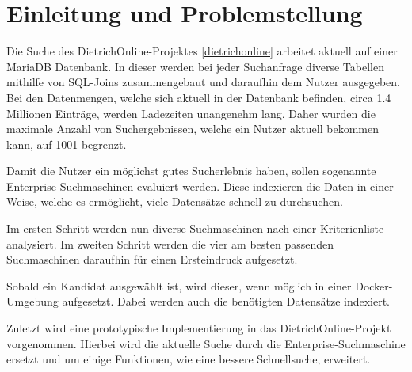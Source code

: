 \chapter{Einleitung und Problemstellung}


Die Suche des DietrichOnline-Projektes \ref{dietrichonline} arbeitet aktuell auf einer MariaDB Datenbank. In dieser werden bei jeder Suchanfrage diverse Tabellen mithilfe von SQL-Joins zusammengebaut und daraufhin dem Nutzer ausgegeben. Bei den Datenmengen, welche sich aktuell in der Datenbank befinden, circa 1.4 Millionen Einträge, werden Ladezeiten unangenehm lang. Daher wurden die maximale Anzahl von Suchergebnissen, welche ein Nutzer aktuell bekommen kann, auf 1001 begrenzt. 

Damit die Nutzer ein möglichst gutes Sucherlebnis haben, sollen sogenannte Enterprise-Suchmaschinen evaluiert werden. Diese indexieren die Daten in einer Weise, welche es ermöglicht, viele Datensätze schnell zu durchsuchen. 

Im ersten Schritt werden nun diverse Suchmaschinen nach einer Kriterienliste analysiert. Im zweiten Schritt werden die vier am besten passenden Suchmaschinen daraufhin für einen Ersteindruck aufgesetzt.

Sobald ein Kandidat ausgewählt ist, wird dieser, wenn möglich in einer Docker-Umgebung aufgesetzt. Dabei werden auch die benötigten Datensätze indexiert.

Zuletzt wird eine prototypische Implementierung in das DietrichOnline-Projekt vorgenommen. Hierbei wird die aktuelle Suche durch die Enterprise-Suchmaschine ersetzt und um einige Funktionen, wie eine bessere Schnellsuche, erweitert. 